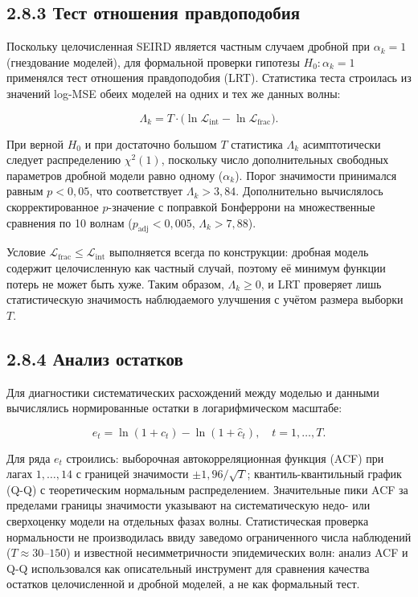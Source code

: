 \documentclass[12pt]{article}
\begin{document}
\subsection{2.8.3 Тест отношения
правдоподобия}\label{ux442ux435ux441ux442-ux43eux442ux43dux43eux448ux435ux43dux438ux44f-ux43fux440ux430ux432ux434ux43eux43fux43eux434ux43eux431ux438ux44f}

Поскольку целочисленная SEIRD является частным случаем дробной при
\(\alpha_k = 1\) (гнездование моделей), для формальной проверки гипотезы
\(H_0 \colon \alpha_k = 1\) применялся тест отношения правдоподобия
(LRT). Статистика теста строилась из значений log-MSE обеих моделей на
одних и тех же данных волны:

\[\Lambda_k = T \cdot \bigl(\ln \mathcal{L}_{\text{int}} - \ln \mathcal{L}_{\text{frac}}\bigr).\]

При верной \(H_0\) и при достаточно большом \(T\) статистика
\(\Lambda_k\) асимптотически следует распределению \(\chi^2(1)\),
поскольку число дополнительных свободных параметров дробной модели равно
одному (\(\alpha_k\)). Порог значимости принимался равным
\(p < 0{,}05\), что соответствует \(\Lambda_k > 3{,}84\). Дополнительно
вычислялось скорректированное \(p\)-значение с поправкой Бонферрони на
множественные сравнения по 10 волнам (\(p_{\text{adj}} < 0{,}005\),
\(\Lambda_k > 7{,}88\)).

Условие \(\mathcal{L}_{\text{frac}} \leq \mathcal{L}_{\text{int}}\)
выполняется всегда по конструкции: дробная модель содержит целочисленную
как частный случай, поэтому её минимум функции потерь не может быть
хуже. Таким образом, \(\Lambda_k \geq 0\), и LRT проверяет лишь
статистическую значимость наблюдаемого улучшения с учётом размера
выборки \(T\).

\subsection{2.8.4 Анализ
остатков}\label{ux430ux43dux430ux43bux438ux437-ux43eux441ux442ux430ux442ux43aux43eux432}

Для диагностики систематических расхождений между моделью и данными
вычислялись нормированные остатки в логарифмическом масштабе:

\[e_t = \ln(1 + c_t) - \ln(1 + \hat{c}_t), \quad t = 1, \ldots, T.\]

Для ряда \({e_t}\) строились: выборочная автокорреляционная функция
(ACF) при лагах \(1, \ldots, 14\) с границей значимости
\(\pm 1{,}96/\sqrt{T}\); квантиль-квантильный график (Q-Q) с
теоретическим нормальным распределением. Значительные пики ACF за
пределами границы значимости указывают на систематическую недо- или
сверхоценку модели на отдельных фазах волны. Статистическая проверка
нормальности не производилась ввиду заведомо ограниченного числа
наблюдений (\(T \approx 30\)--\(150\)) и известной несимметричности
эпидемических волн: анализ ACF и Q-Q использовался как описательный
инструмент для сравнения качества остатков целочисленной и дробной
моделей, а не как формальный тест.
\end{document}
